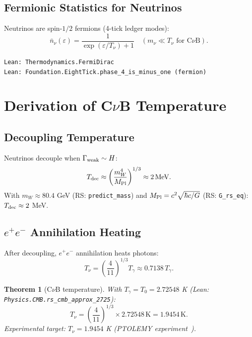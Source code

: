 \documentclass[12pt,a4paper]{article}
\newtheorem{theorem}{Theorem}[section]
\theoremstyle{definition}
\theoremstyle{remark}
\begin{document}
\subsection{Fermionic Statistics for Neutrinos}

Neutrinos are spin-$1/2$ fermions (4-tick ledger modes):
\begin{equation}
  \bar{n}_\nu(\varepsilon) = \frac{1}{\exp(\varepsilon/T_\nu) + 1}
  \quad (m_\nu \ll T_\nu \text{ for C}\nu\text{B}).
\end{equation}

\texttt{Lean: Thermodynamics.FermiDirac}\\
\texttt{Lean: Foundation.EightTick.phase\_4\_is\_minus\_one (fermion)}

\section{Derivation of C$\nu$B Temperature}

\subsection{Decoupling Temperature}

Neutrinos decouple when $\Gamma_{\rm weak} \sim H$:
\begin{equation}
  T_{\rm dec} \approx \left(\frac{m_W^4}{M_{\rm Pl}}\right)^{1/3}
  \approx 2\,\text{MeV}.
\end{equation}
With $m_W \approx 80.4$ GeV (RS: \texttt{predict\_mass}) and
$M_{\rm Pl} = c^2\sqrt{\hbar c/G}$ (RS: \texttt{G\_rs\_eq}): $T_{\rm dec} \approx 2$ MeV.

\subsection{$e^+e^-$ Annihilation Heating}

After decoupling, $e^+e^-$ annihilation heats photons:
\begin{equation}
  T_\nu = \left(\frac{4}{11}\right)^{1/3} T_\gamma
  \approx 0.7138\,T_\gamma.
\end{equation}

\begin{theorem}[C$\nu$B temperature]\label{thm:Tnu}
With $T_\gamma = T_0 = 2.72548$ K (Lean: \texttt{Physics.CMB.rs\_cmb\_approx\_2725}):
\begin{equation}
  T_\nu = \left(\frac{4}{11}\right)^{1/3} \times 2.72548\,\text{K}
  = 1.9454\,\text{K}.
\end{equation}
Experimental target: $T_\nu = 1.9454$ K (PTOLEMY experiment~\cite{PTOLEMY2022}).
\end{theorem}
\end{document}
